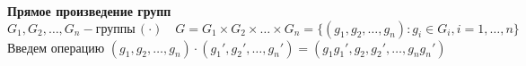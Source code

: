 \documentclass[12pt]{article}
\begin{document}
				\textbf{Прямое произведение групп} \\
				$G_1, G_2, \dots , G_n - \text{группы} \, (\cdot) \quad G=G_1\times G_2 \times \dots \times G_n=\{ (g_1,g_2, \dots , g_n):g_i\in G_i, i=1, \dots , n  \}$ \\
				Введем операцию $(g_1,g_2, \dots , g_n) \cdot (g_1',g_2', \dots , g_n')=(g_1 g_1', g_2, g_2', \dots, g_n g_n') $
			
				
				
				
				
				
				
		
\end{document}
